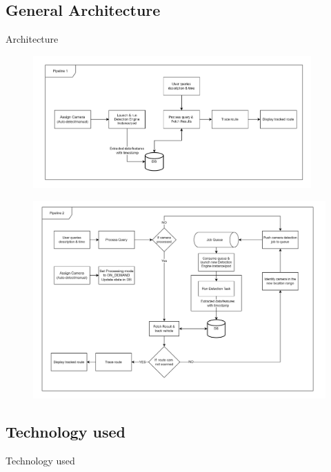 \documentclass{beamer}
\begin{document}
\subsection{General Architecture}
\begin{frame}[allowframebreaks]{Architecture}
	\begin{figure}
		\includegraphics[width=0.95\textwidth]{res/pipeline1.png}
	\end{figure}
	\begin{figure}
		\includegraphics[height=0.8\textheight]{res/pipeline2.png}
	\end{figure}
\end{frame}

\subsection{Technology used}
\begin{frame}{Technology used}
	
\end{frame}
\end{document}
